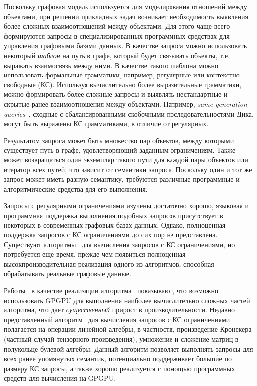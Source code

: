 \documentclass[14pt]{matmex-diploma-custom}
\begin{document}
Поскольку графовая модель используется для моделирования отношений между объектами, при решении 
прикладных задач возникает необходимость выявления более сложных взаимоотношений между 
объектами. Для этого чаще всего формируются запросы в специализированных программных средствах 
для управления графовыми базами данных. В качестве запроса можно использовать некоторый 
\textit{шаблон} на путь в графе, который будет связывать объекты, т.е. выражать взаимосвязь 
между ними. В качестве такого шаблона можно использовать формальные грамматики, например, 
регулярные или контекстно-свободные (КС). Используя вычислительно более выразительные 
грамматики, можно формировать более сложные запросы и выявлять нестандартные и скрытые ранее 
взаимоотношения между объектами. Например, \textit{same-generation 
queries}~\cite{inbook:databases_intro}, сходные с сбалансированными скобочными 
последовательностями Дика, могут быть выражены КС грамматиками, в отличие от регулярных.

Результатом запроса может быть множество пар объектов, между которыми существует путь в графе, 
удовлетворяющий заданным ограничениям. Также может возвращаться один экземпляр такого пути для 
каждой пары объектов или итератор всех путей, что зависит от семантики запроса. Поскольку один 
и тот же запрос может иметь разную семантику, требуются различные программные и алгоритмические
средства для его выполнения.  

Запросы с регулярными ограничениями изучены достаточно хорошо, языковая и программная поддержка 
выполнения подобных запросов присутствует в некоторых в современных графовых базах данных. 
Однако, полноценная поддержка запросов с КС ограничениями до сих пор не представлена. Существуют
алгоритмы~\cite{DBLP:journals/corr/ZhangFWR15, article:hellings_cfpq, inproceedings:matrix_cfpq,
inbook:kronecker_cfpq_adbis, article:cfpq_go_for_rdf} для вычисления запросов с КС 
ограничениями, но потребуется еще время, прежде чем появиться полноценная высокпроизводительная 
реализация одного из алгоритмов, способная обрабатывать реальные графовые данные.

Работы~\cite{inproceedings:cfpq_matrix_evaluation, inproceedings:cfqp_matrix_with_single_source}
в качестве реализации алгоритма~\cite{inproceedings:matrix_cfpq} показывают, что возможно 
использовать GPGPU для выполнения наиболее вычислительно сложных частей алгоритма, что дает 
\textit{существенный} прирост в производительности. Недавно представленный 
алгоритм~\cite{inbook:kronecker_cfpq_adbis} для вычисления запросов с КС ограничениями 
полагается на операции линейной алгебры, в частности, произведение Кронекера (частный случай 
тензорного произведения), умножение и сложение матриц в полукольце булевой алгебры. Данный 
алгоритм позволяет выполнять запросы для всех ранее упомянутых семантик, потенциально 
поддерживает больш\'ие по размеру КС запросы, а также хорошо реализуется с помощью программных 
средств для вычисления на GPGPU.
\end{document}

